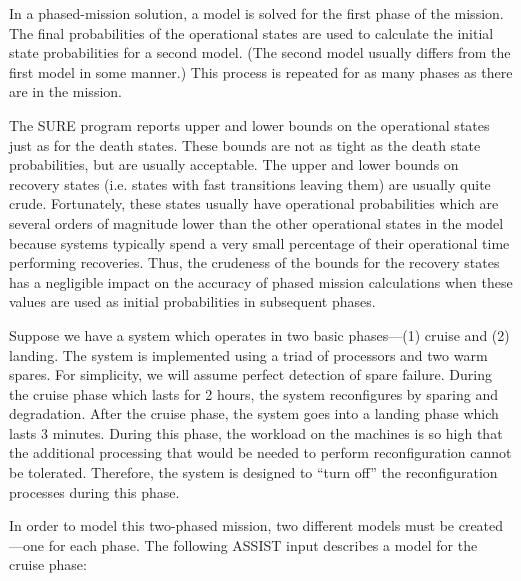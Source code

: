      In a phased-mission solution, a model is solved for the first phase of the
mission.  The final probabilities of the operational states are
used to calculate the initial state probabilities for a second
model. (The second model usually differs from the first model in
some manner.) This process is repeated for as many phases as there
are in the mission.
  
     The SURE program reports upper and lower bounds on the
operational states just as for the death states.  These bounds are
not as tight as the death state probabilities, but are usually
acceptable.  The upper and lower bounds on recovery states (i.e.
states with fast transitions leaving them) are usually quite crude.
Fortunately, these states usually have operational probabilities
which are several orders of magnitude lower than the other operational states
in the model because systems typically spend a very small percentage of their
operational time performing recoveries.  Thus, the crudeness of the bounds for
the recovery states has a negligible impact on the accuracy of phased mission
calculations when these values are used as initial probabilities in subsequent
phases.

Suppose we have a system which operates in two basic phases---(1)
cruise and (2) landing.  The system is implemented using a triad of
processors and two warm spares.  For simplicity, we will assume
perfect detection of spare failure.  During the cruise phase which
lasts for 2 hours, the system reconfigures by sparing and degradation.  
After the cruise phase, the system goes into
a landing phase which lasts 3 minutes.  During this phase, the workload
on the machines is so high that the additional processing that would
be needed to perform
reconfiguration cannot be tolerated.  Therefore, the system is
designed to ``turn off'' the reconfiguration processes during this phase.

In order to model this two-phased mission, two different models must
be created---one for each phase.  The following ASSIST input describes a 
model for the cruise phase:

